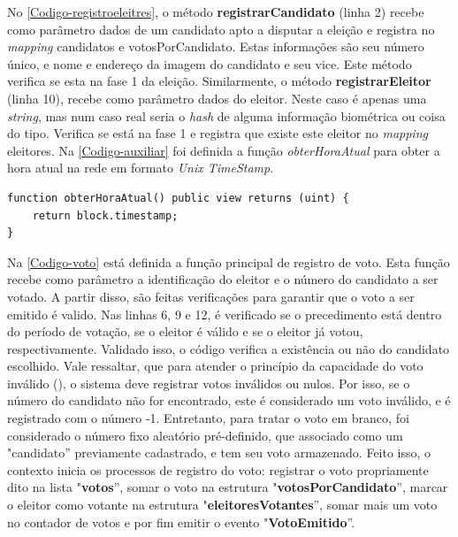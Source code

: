 \documentclass[portuguese]{textolivre}
\begin{document}
	No \autoref{Codigo-registroeleitres}, o método \textbf{registrarCandidato} (linha 2) recebe como parâmetro dados de um candidato apto a disputar a eleição e registra no \textit{mapping} candidatos e votosPorCandidato. Estas informações são seu número único, e nome e endereço da imagem do candidato e seu vice. Este método verifica se esta na fase 1 da eleição. 
	Similarmente, o método \textbf{registrarEleitor} (linha 10), recebe como parâmetro dados do eleitor. Neste caso é apenas uma \textit{string}, mas num caso real seria o \textit{hash} de alguma informação biométrica ou coisa do tipo. Verifica se está na fase 1 e registra que existe este eleitor no \textit{mapping} eleitores. Na \autoref{Codigo-auxiliar} foi definida a função \textit{obterHoraAtual} para obter a hora atual na rede em formato \textit{Unix TimeStamp}.
	
	
\begin{lstlisting}[language=Solidity, label=Codigo-auxiliar, caption={Função auxiliar para obter hora atual em Unix TimeStamp do Contrato Inteligente desenvolvido.}, source={Autor.}]
function obterHoraAtual() public view returns (uint) {
	return block.timestamp; 
}
\end{lstlisting} %
	
	Na \autoref{Codigo-voto} está definida a função principal de registro de voto. Esta função recebe como parâmetro a identificação do eleitor e o número do candidato a ser votado. A partir disso, são feitas verificações para garantir que o voto a ser emitido é valido. Nas linhas 6, 9 e 12, é verificado se o precedimento está dentro do período de votação, se o eleitor é válido e se o eleitor já votou, respectivamente. Validado isso, o código verifica a existência ou não do candidato escolhido. Vale ressaltar, que para atender o princípio da capacidade do voto inválido (), o sistema deve registrar votos inválidos ou nulos. Por isso, se o número do candidato não for encontrado, este é considerado um voto inválido, e é registrado com o número -1. Entretanto, para tratar o voto em branco, foi considerado o número fixo aleatório pré-definido, que associado  como um "candidato'' previamente cadastrado, e tem seu voto armazenado. 
	Feito isso, o contexto inicia os processos de registro do voto: registrar o voto propriamente dito na lista "\textbf{votos}'', somar o voto na estrutura "\textbf{votosPorCandidato}'', marcar o eleitor como votante na estrutura "\textbf{eleitoresVotantes}'', somar mais um voto no contador de votos e por fim emitir o evento "\textbf{VotoEmitido}''.
	
\end{document}
